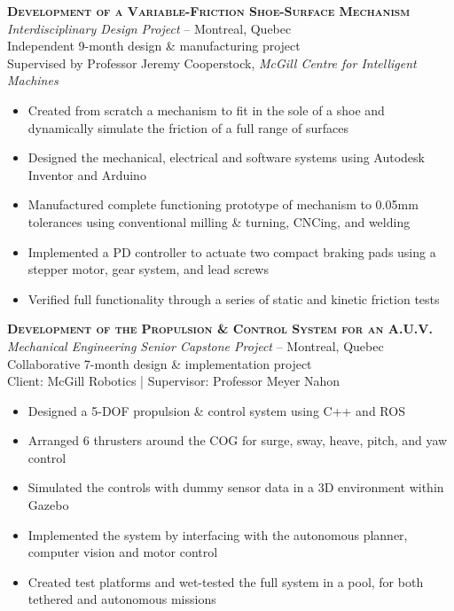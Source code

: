 \documentclass[12pt, letterpaper]{article}
\newcommand{\years}[1]{\marginnote{\footnotesize #1}} %
\begin{document}
	\begin{samepage}
		\years{9/2013 - 7/2014} \textbf{\scshape Development of a Variable-Friction Shoe-Surface Mechanism}\\
		{\textit{Interdisciplinary Design Project}} -- Montreal, Quebec\\
		{\small Independent 9-month design \& manufacturing project}\\
		{\small Supervised by Professor Jeremy Cooperstock, \textsl {McGill Centre for Intelligent Machines}}
		\begin{itemize}
			\item Created from scratch a mechanism to fit in the sole of a shoe and dynamically simulate the friction of a full range of surfaces %
			\item Designed the mechanical, electrical and software systems using Autodesk Inventor and Arduino
			\item Manufactured complete functioning prototype of mechanism to 0.05mm tolerances using conventional milling \& turning, CNCing, and welding
			\item Implemented a PD controller to actuate two compact braking pads using a stepper motor, gear system, and lead screws
			\item Verified full functionality through a series of static and kinetic friction tests 
		\end{itemize}
	\end{samepage}
	\vspace{.1in}

	\begin{samepage}
		\years{9/2013 - 5/2014} \textbf{\scshape Development of the Propulsion \& Control System for an A.U.V.}\\
		{\textit{Mechanical Engineering Senior Capstone Project}} -- Montreal, Quebec\\
		{\small Collaborative 7-month design \& implementation project}\\
		{\small Client: McGill Robotics | Supervisor: Professor Meyer Nahon}
		\begin{itemize}
			\item Designed a 5-DOF propulsion \& control system using C++ and ROS
			\item Arranged 6 thrusters around the COG for surge, sway, heave, pitch, and yaw control
			\item Simulated the controls with dummy sensor data in a 3D environment within Gazebo 
			\item Implemented the system by interfacing with the autonomous planner, computer vision and motor control
			\item Created test platforms and wet-tested the full system in a pool, for both tethered and autonomous missions
		\end{itemize}
	\end{samepage}
	\vspace{.1in}
\end{document}
